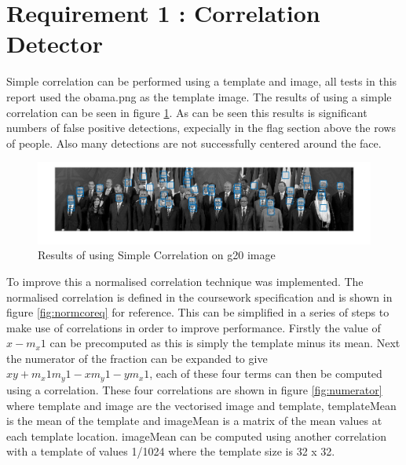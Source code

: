 \documentclass{article}
\begin{document}

\section{Requirement 1 : Correlation Detector}

Simple correlation can be performed using a template and image,
all tests in this report used the obama.png as the template image. The results of
using a simple correlation can be seen in figure \ref{fig:simplecor}. As can be
seen this results is significant numbers of false positive detections, expecially
in the flag section above the rows of people. Also many detections are not successfully
centered around the face.\\

\begin{figure}[H]
  \includegraphics[width=\linewidth]{simpleCor.jpg}
  \caption{Results of using Simple Correlation on g20 image}
  \label{fig:simplecor}
\end{figure}

To improve this a normalised correlation technique was implemented. The normalised correlation
is defined in the coursework specification and is shown in figure \ref{fig:normcoreq} for reference.
This can be simplified in a series of steps to make use of correlations in order to
improve performance. Firstly the value of $x - m_x1$ can be precomputed as this is
simply the template minus its mean. Next the numerator of the fraction can be expanded
to give $xy + m_x1m_y1 - xm_y1 - ym_x1$, each of these four terms can then be computed
using a correlation. These four correlations are shown in figure \ref{fig:numerator}
where template and image are the vectorised image and template, templateMean is
the mean of the template and imageMean is a matrix of the mean values at each template
location. imageMean can be computed using another correlation with a template of values 1/1024 where
the template size is 32 x 32.\\
\end{document}
